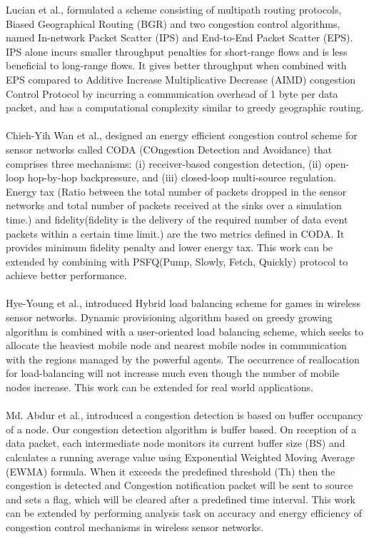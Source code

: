 \documentclass[journal]{IEEEtran}
\begin{document}
\indent Lucian et al., \cite{IPS} formulated a scheme consisting of multipath routing protocols, Biased Geographical Routing (BGR) and two congestion control algorithms, named In-network Packet Scatter (IPS) and End-to-End Packet Scatter (EPS). IPS alone incurs smaller throughput penalties for short-range flows and is less beneficial to long-range flows. It gives better throughput when combined with EPS compared to Additive Increase Multiplicative Decrease (AIMD) congestion Control Protocol by incurring a communication overhead of 1 byte per data packet, and has a computational complexity similar to greedy geographic routing.\\ \\
\indent Chieh-Yih Wan et al., \cite{CODA} designed an energy efficient congestion control scheme for sensor networks called CODA (COngestion Detection and Avoidance) that comprises three mechanisms: (i) receiver-based congestion detection, (ii) open-loop hop-by-hop backpressure, and (iii) closed-loop multi-source regulation. Energy tax (Ratio between the total number of packets dropped in the sensor networks and total number of packets received at the sinks over a simulation time.) and fidelity(fidelity is the delivery of the required number of data event packets within a certain time limit.) are the two metrics defined in CODA. It provides minimum fidelity penalty and lower energy tax. This work can be extended by combining with PSFQ(Pump, Slowly, Fetch, Quickly) protocol to achieve better performance.\\ \\
\indent Hye-Young et al., \cite{Hybrid} introduced Hybrid load balancing scheme for games in wireless sensor networks. Dynamic provisioning algorithm based on greedy growing algorithm is combined with  a user-oriented load balancing scheme, which seeks to allocate the heaviest mobile node and nearest mobile nodes in communication with the regions managed by the powerful agents. The occurrence of reallocation for load-balancing will not increase much even though the number of mobile nodes increase. This work can be extended for real world applications.\\ \\
\indent Md. Abdur et al., \cite{Buffer} introduced a congestion detection is based on buffer occupancy of a node. Our congestion detection algorithm is buffer based. On reception of a data packet, each intermediate node monitors its current buffer size (BS) and calculates a running average value using Exponential Weighted Moving Average (EWMA) formula.  When it exceeds the predefined threshold (Th) then the congestion is detected and Congestion notification packet  will be sent to source and sets a flag, which will be cleared after a predefined time interval. This work can be extended by performing analysis task on accuracy and energy efficiency of congestion control mechanisms in wireless sensor networks.\\ \\
\end{document}

